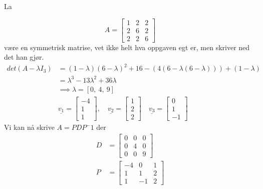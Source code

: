 \documentclass[11pt, a4paper, norsk]{article}
\begin{document}
        \begin{Example}{}{}
            La

            $$
                A = \begin{bmatrix}
                    1 & 2 & 2 \\
                    2 & 6 & 2 \\
                    2 & 2 & 6
                \end{bmatrix}
            $$
            være en symmetrisk matrise, vet ikke helt hva oppgaven egt er, men skriver ned det han gjør.
            \begin{align*}
                det(A - \lambda I_3) &= (1-\lambda)(6-\lambda)^2+16 - (4(6-\lambda(6-\lambda))) + (1-\lambda) \\
                                     &= \lambda^3 - 13\lambda^2 + 36\lambda \\
                                     &\implies \lambda = \left[ 0, \  4, \  9\right]\\
                                     &\underline{v_1} = \begin{bmatrix}
                                         -4 \\
                                         1 \\
                                         1
                                     \end{bmatrix}, \quad \underline{v_2} = \begin{bmatrix}
                                         1 \\
                                         2 \\
                                         2
                                     \end{bmatrix} \quad \underline{v_3} = \begin{bmatrix}
                                         0 \\
                                         1 \\
                                         -1
                                     \end{bmatrix} 
            \end{align*}
            Vi kan nå skrive $A = PDP^-1$ der \begin{align*}
            D &= \begin{bmatrix}
                    0 & 0 & 0 \\
                    0 & 4 & 0 \\
                    0 & 0 & 9
                \end{bmatrix} \\
                P &= \begin{bmatrix}
                    -4 & 0 & 1 \\
                    1 & 1 & 2 \\
                    1 & -1 & 2
                \end{bmatrix}    
            \end{align*}


\end{Example}
\end{document}
